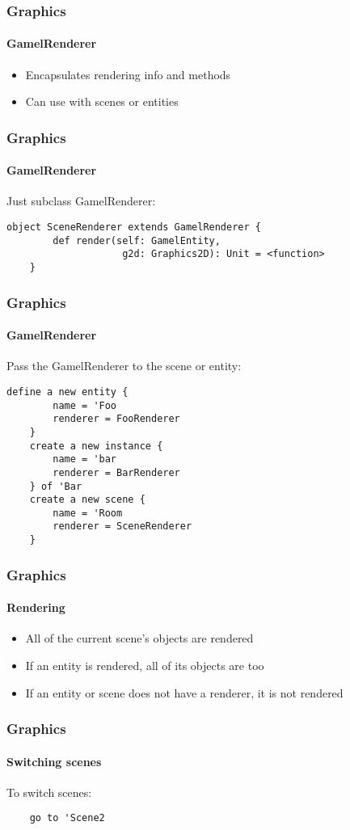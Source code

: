 \documentclass{beamer}
\begin{document}
\begin{frame}
    \frametitle{Graphics}
    \framesubtitle{GamelRenderer}
    \begin{itemize}[<+->]
        \item{Encapsulates rendering info and methods}
        \item{Can use with scenes or entities}
    \end{itemize}
\end{frame}

\begin{frame}[fragile]
    \frametitle{Graphics}
    \framesubtitle{GamelRenderer}
    Just subclass GamelRenderer:
    \begin{lstlisting}[basicstyle=\small]
    object SceneRenderer extends GamelRenderer {
        def render(self: GamelEntity,
                    g2d: Graphics2D): Unit = <function>
    }
    \end{lstlisting}
\end{frame}

\begin{frame}[fragile]
    \frametitle{Graphics}
    \framesubtitle{GamelRenderer}
    Pass the GamelRenderer to the scene or entity:
    \begin{lstlisting}[basicstyle=\small]
    define a new entity {
        name = 'Foo
        renderer = FooRenderer
    }
    create a new instance {
        name = 'bar
        renderer = BarRenderer
    } of 'Bar
    create a new scene {
        name = 'Room
        renderer = SceneRenderer
    }
    \end{lstlisting}
\end{frame}

\begin{frame}
    \frametitle{Graphics}
    \framesubtitle{Rendering}
    \begin{itemize}[<+->]
        \item{All of the current scene's objects are rendered}
        \item{If an entity is rendered, all of its objects are too}
        \item{If an entity or scene does not have a renderer, it is not rendered}
    \end{itemize}
\end{frame}

\begin{frame}[fragile]
    \frametitle{Graphics}
    \framesubtitle{Switching scenes}
    To switch scenes:
    \begin{lstlisting}
    go to 'Scene2
    \end{lstlisting}
\end{frame}
\end{document}
